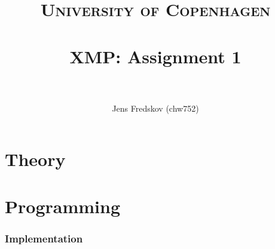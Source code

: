\documentclass[a4paper, 11pt]{article}
\title{ 
\normalfont \normalsize 
\textsc{University of Copenhagen} \\ [25pt]
\horrule{0.5pt} \\[0.4cm]
\huge XMP: Assignment 1 \\
\horrule{2pt} \\[0.5cm]
}
\author{Jens Fredskov (chw752)}
\begin{document}
\maketitle

\part{Theory} %
\label{prt:theory_}

\section{} %


\section{} %


\section{} %



\part{Programming} %
\label{prt:programming_}

\section{Implementation} %
\label{sec:implementation}


\end{document}
